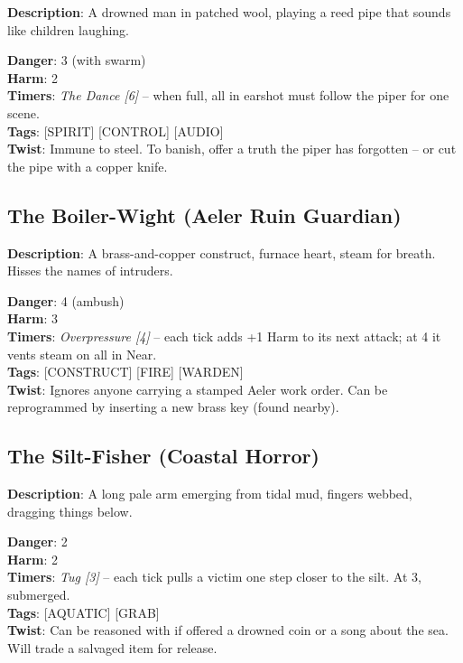 \noindent\textbf{Description}: A drowned man in patched wool, playing a reed pipe that sounds like children laughing.

\noindent\textbf{Danger}: 3 (with swarm)\\
\textbf{Harm}: 2\\
\textbf{Timers}: \emph{The Dance [6]} -- when full, all in earshot must follow the piper for one scene.\\
\textbf{Tags}: [SPIRIT] [CONTROL] [AUDIO]\\
\textbf{Twist}: Immune to steel. To banish, offer a truth the piper has forgotten -- or cut the pipe with a copper knife.


\subsection*{The Boiler-Wight (Aeler Ruin Guardian)}

\noindent\textbf{Description}: A brass-and-copper construct, furnace heart, steam for breath. Hisses the names of intruders.

\noindent\textbf{Danger}: 4 (ambush)\\
\textbf{Harm}: 3\\
\textbf{Timers}: \emph{Overpressure [4]} -- each tick adds +1 Harm to its next attack; at 4 it vents steam on all in Near.\\
\textbf{Tags}: [CONSTRUCT] [FIRE] [WARDEN]\\
\textbf{Twist}: Ignores anyone carrying a stamped Aeler work order. Can be reprogrammed by inserting a new brass key (found nearby).


\subsection*{The Silt-Fisher (Coastal Horror)}

\noindent\textbf{Description}: A long pale arm emerging from tidal mud, fingers webbed, dragging things below.

\noindent\textbf{Danger}: 2\\
\textbf{Harm}: 2\\
\textbf{Timers}: \emph{Tug [3]} -- each tick pulls a victim one step closer to the silt. At 3, submerged.\\
\textbf{Tags}: [AQUATIC] [GRAB]\\
\textbf{Twist}: Can be reasoned with if offered a drowned coin or a song about the sea. Will trade a salvaged item for release.


